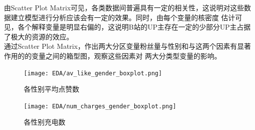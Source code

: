 \documentclass{ctexart}
\begin{document}
由Scatter Plot Matrix可见，各类数据间普遍具有一定的相关性，这说明对这些数据建立模型进行分析应该会有一定的效果。同时，由每个变量的核密度
估计可见，各个解释变量是明显右偏的，这说明B站的UP主存在一定的少部分UP主占据了极大的资源的效应。\\

通过Scatter Plot Matrix，作出两大分区变量粉丝量与性别和与这两个因素有显著作用的的变量之间的箱型图，观察这些因素对
两大分类型变量的影响。

\begin{figure}[H]
    \centering
    \begin{minipage}[t]{0.48\textwidth}
        \centering
        \texttt{[image: EDA/av\_like\_gender\_boxplot.png]}
        \caption{各性别平均点赞数}
    \end{minipage}
    \begin{minipage}[t]{0.48\textwidth}
        \centering
        \texttt{[image: EDA/num\_charges\_gender\_boxplot.png]}
        \caption{各性别充电数}
    \end{minipage}
\end{figure}
\end{document}
